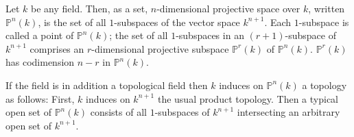 Let $k$ be any field. Then, as a set, $n$-dimensional projective space over $k$, written $\mathbb{P}^n(k)$, is the set of all $1$-subspaces of the vector space $k^{n+1}$. Each $1$-subspace is called a point of $\mathbb{P}^n(k)$; the set of all $1$-subspaces in an $(r+1)$-subspace of $k^{n+1}$ comprises an $r$-dimensional projective subspace $\mathbb{P}^r(k)$ of $\mathbb{P}^n(k)$. $\mathbb{P}^r(k)$ has codimension $n-r$ in $\mathbb{P}^n(k)$.

If the field is in addition a topological field then $k$ induces on $\mathbb{P}^n(k)$ a topology as follows: First, $k$ induces on $k^{n+1}$ the usual product topology. Then a typical open set of $\mathbb{P}^n(k)$ consists of all $1$-subspaces of $k^{n+1}$ intersecting an arbitrary open set of $k^{n+1}$.
